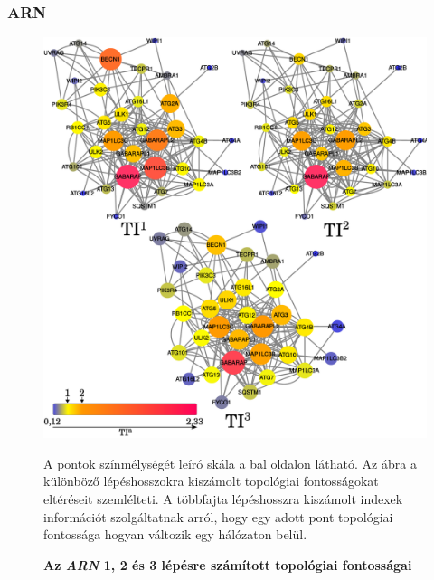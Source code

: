 \documentclass[a4paper,12pt]{article}
\newenvironment{imgdesc}{
		\small
		\singlespacing
		\begin{center}
		
	}{
		\end{center}	
	}
\begin{document}
		\subsubsection{ARN}
	
				\begin{figure}[H]
					\includegraphics[scale=0.48]{img/arn_123_comp.pdf}
					\centering
					\caption{ \textbf{Az \textit{ARN} 1, 2 és 3 lépésre számított topológiai fontosságai}}
					\begin{imgdesc}
						A pontok színmélységét leíró skála a bal oldalon látható. Az ábra a különböző lépéshosszokra kiszámolt topológiai fontosságokat eltéréseit szemlélteti. A többfajta lépéshosszra kiszámolt indexek információt szolgáltatnak arról, hogy egy adott pont topológiai fontossága hogyan változik egy hálózaton belül.
					\end{imgdesc}
		
					\label{fig:arn123}			 		 
				\end{figure}
				
\end{document}
